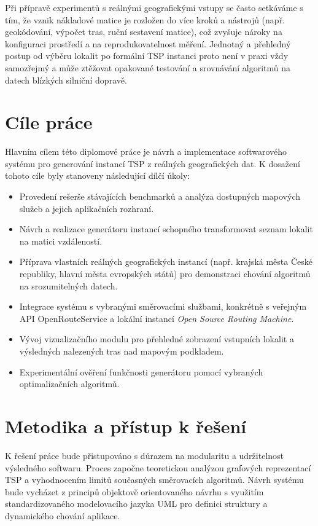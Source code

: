 Při přípravě experimentů s reálnými geografickými vstupy se často setkáváme s tím, že vznik nákladové matice je rozložen do více kroků a nástrojů (např. geokódování, výpočet tras, ruční sestavení matice), což zvyšuje nároky na konfiguraci prostředí a na reprodukovatelnost měření. Jednotný a přehledný postup od výběru lokalit po formální TSP instanci proto není v praxi vždy samozřejmý a může ztěžovat opakované testování a srovnávání algoritmů na datech blízkých silniční dopravě.

\section{Cíle práce}
Hlavním cílem této diplomové práce je návrh a implementace softwarového systému pro generování instancí TSP z reálných geografických dat. K dosažení tohoto cíle byly stanoveny následující dílčí úkoly:

\begin{itemize}
    \item Provedení rešerše stávajících benchmarků a analýza dostupných mapových služeb a jejich aplikačních rozhraní.
    \item Návrh a realizace generátoru instancí schopného transformovat seznam lokalit na matici vzdáleností.
    \item Příprava vlastních reálných geografických instancí (např. krajská města České republiky, hlavní města evropských států) pro demonstraci chování algoritmů na srozumitelných datech.
    \item Integrace systému s vybranými směrovacími službami, konkrétně s veřejným API OpenRouteService a lokální instancí \textit{Open Source Routing Machine}.
    \item Vývoj vizualizačního modulu pro přehledné zobrazení vstupních lokalit a výsledných nalezených tras nad mapovým podkladem.
    \item Experimentální ověření funkčnosti generátoru pomocí vybraných optimalizačních algoritmů.
\end{itemize}

\section{Metodika a přístup k řešení}

K řešení práce bude přistupováno s důrazem na modularitu a udržitelnost výsledného softwaru. Proces započne teoretickou analýzou grafových reprezentací TSP a vyhodnocením limitů současných směrovacích algoritmů. Návrh systému bude vycházet z principů objektově orientovaného návrhu s využitím standardizovaného modelovacího jazyka UML pro definici struktury a dynamického chování aplikace.

